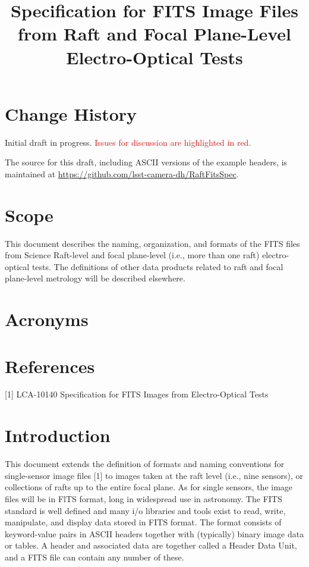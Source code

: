 \documentclass{article}[12pt]
\title{Specification for FITS Image Files from Raft and Focal Plane-Level Electro-Optical Tests}
\newcommand{\red}{\textcolor{red}}
\begin{document}
\maketitle
\tableofcontents
\newpage
\listoftables

\section{Change History}
Initial draft in progress.  \red{Issues for discussion are highlighted in red.}

The source for this draft, including ASCII versions of the example headers, is maintained at \url{https://github.com/lsst-camera-dh/RaftFitsSpec}.

\section{Scope}
This document describes the naming, organization, and formats of the FITS files from Science Raft-level and focal plane-level (i.e., more than one raft) electro-optical tests.  The definitions of other data products related to raft and focal plane-level metrology will be described elsewhere.

\section{Acronyms}

\section{References}

[1] LCA-10140 Specification for FITS Images from Electro-Optical Tests





\section{Introduction}
This document extends the definition of formats and naming conventions for single-sensor image files [1] to images taken at the raft level (i.e., nine sensors), or collections of rafts up to the entire focal plane.  As for single sensors, the image files will be in FlTS format, long in widespread use in astronomy.  The FITS standard is well defined and many i/o libraries and tools exist to read, write, manipulate, and display data stored in FITS format.  The format consists of keyword-value pairs in ASCII headers together with (typically) binary image data or tables.  A header and associated data are together called a Header Data Unit, and a FITS file can contain any number of these.
\end{document}
